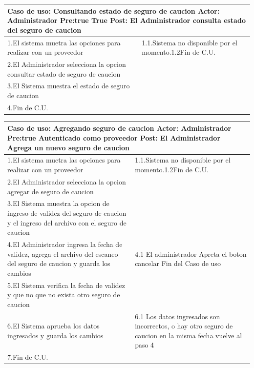 \begin{longtable}{|p{}|p{}|}
    \hline
    \multicolumn{2}{|p{16cm}|}{
        \textbf{Caso de uso:} Consultando estado de seguro de caucion \newline
        \textbf{Actor:} Administrador\newline
        \textbf{Pre:true }  True\newline
        \textbf{Post:} El Administrador consulta estado del seguro de caucion
    }\\
    \hline
    1.El sistema  muetra las opciones para realizar con un proveedor & 1.1.Sistema no  disponible por el momento.\newline 1.2Fin de C.U.\\
    \hline
    2.El Administrador selecciona la opcion consultar estado de seguro de caucion&  \\
    \hline
    3.El Sistema muestra el estado de seguro de caucion&  \\
    \hline
    4.Fin de C.U.& \\
    \hline
\end{longtable}

\begin{longtable}{|p{}|p{}|}
    \hline
    \multicolumn{2}{|p{16cm}|}{
        \textbf{Caso de uso:} Agregando seguro de caucion\newline
        \textbf{Actor:} Administrador\newline
        \textbf{Pre:true }  Autenticado como proveedor\newline
        \textbf{Post:} El Administrador Agrega un nuevo seguro de caucion
    }\\
    \hline
    1.El sistema  muetra las opciones para realizar con un proveedor & 1.1.Sistema no  disponible por el momento.\newline 1.2Fin de C.U.\\
    \hline
    2.El Administrador selecciona la opcion agregar de seguro de caucion& \\
    \hline
    3.El Sistema muestra la opcion de ingreso de validez del seguro de caucion y el ingreso del archivo con el seguro de caucion&  \\
    \hline
    4.El Administrador ingresa la fecha de validez, agrega el archivo del escaneo del seguro de caucion y guarda los cambios&4.1 El administrador Apreta el boton cancelar \newline 4.2 Fin del Caso de uso \\
    \hline
    5.El Sistema verifica la fecha de validez y que no que no exista otro seguro de caucion & \\
    \hline
    6.El Sistema aprueba los datos ingresados y guarda los cambios &6.1 Los datos ingresados son incorrectos, o hay otro seguro de caucion en la misma fecha  \newline 6.2 vuelve al paso 4\\
    \hline
    7.Fin de C.U.& \\
    \hline
\end{longtable}

